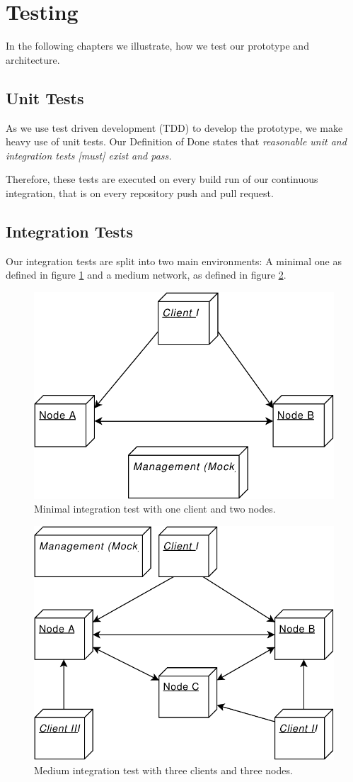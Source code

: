 
\section{Testing}
\label{testing}

In the following chapters we illustrate, how we test our prototype and architecture.

\subsection{Unit Tests}\label{unit-tests}
As we use test driven development (TDD) to develop the prototype, we make heavy use of unit tests. Our Definition of Done\cite{project-plan} states that \emph{reasonable unit and integration tests [must] exist and pass.}

Therefore, these tests are executed on every build run of our continuous integration, that is on every repository push and pull request.


\subsection{Integration Tests}\label{integration-tests}
Our integration tests are split into two main environments: A minimal one as defined in figure \ref{fig:integrationtestsmall} and a medium network, as defined in figure \ref{fig:integrationtestmedium}.

\begin{figure}
	\centering
	\includegraphics[width=0.5\linewidth]{resources/integration_test_small}
	\caption[Minimal integration test]{Minimal integration test with one client and two nodes.}
	\label{fig:integrationtestsmall}
\end{figure}

\begin{figure}
	\centering
	\includegraphics[width=0.5\linewidth]{resources/integration_test_medium}
	\caption[Medium integration test]{Medium integration test with three clients and three nodes.}
	\label{fig:integrationtestmedium}
\end{figure}

